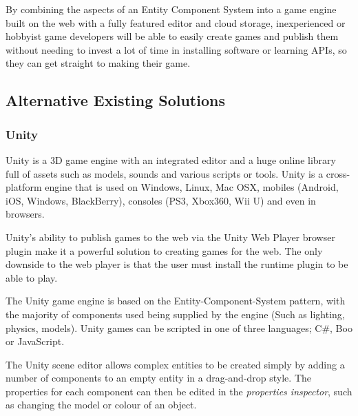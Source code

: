 \documentclass[a4paper, 12pt]{article}
\begin{document}

By combining the aspects of an Entity Component System into a game engine built on the web with a fully featured editor and cloud storage, inexperienced or hobbyist game developers will be able to easily create games and publish them without needing to invest a lot of time in installing software or learning APIs, so they can get straight to making their game.

\subsection{Alternative Existing Solutions}
\subsubsection{Unity}
Unity is a 3D game engine with an integrated editor and a huge online library full of assets such as models, sounds and various scripts or tools. Unity is a cross-platform engine that is used on Windows, Linux, Mac OSX, mobiles (Android, iOS, Windows, BlackBerry), consoles (PS3, Xbox360, Wii U) and even in browsers.


Unity's ability to publish games to the web via the Unity Web Player browser plugin make it a powerful solution to creating games for the web. The only downside to the web player is that the user must install the runtime plugin to be able to play.


The Unity game engine is based on the Entity-Component-System pattern, with the majority of components used being supplied by the engine (Such as lighting, physics, models). Unity games can be scripted in one of three languages; C\#, Boo or JavaScript.


The Unity scene editor allows complex entities to be created simply by adding a number of components to an empty entity in a drag-and-drop style. The properties for each component can then be edited in the \emph{properties inspector}, such as changing the model or colour of an object. 

\end{document}
